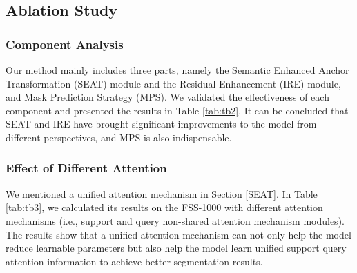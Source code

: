 \documentclass{bmvc2k}
\begin{document}
\subsection{Ablation Study}
\subsubsection{Component Analysis}
Our method mainly includes three parts, namely the Semantic Enhanced Anchor Transformation (SEAT) module and the Residual Enhancement (IRE) module, and Mask Prediction Strategy (MPS).
We validated the effectiveness of each component and presented the results in Table \ref{tab:tb2}.
It can be concluded that SEAT and IRE have brought significant improvements to the model from different perspectives, and MPS is also indispensable.

\subsubsection{Effect of Different Attention}
We mentioned a unified attention mechanism in Section \ref{SEAT}.
In Table \ref{tab:tb3}, we calculated its results on the FSS-1000 with different attention mechanisms (i.e., support and query non-shared attention mechanism modules).
The results show that a unified attention mechanism can not only help the model reduce learnable parameters but also help the model learn unified support query attention information to achieve better segmentation results.

\begin{table}[ht]
\begin{floatrow}
\end{floatrow}
\end{table}
\end{document}
